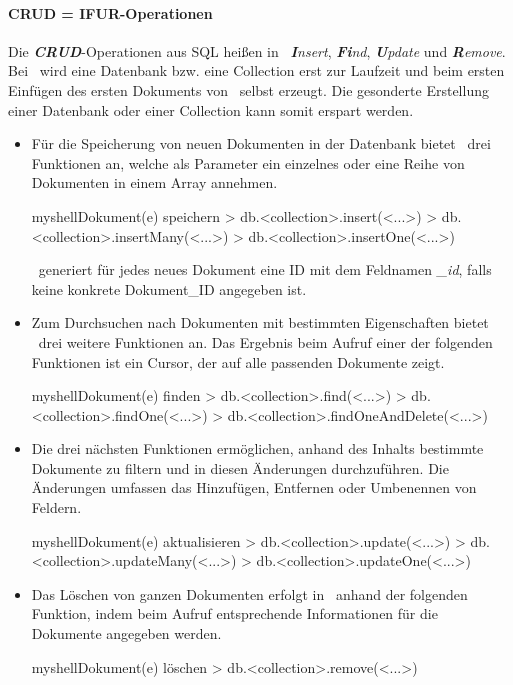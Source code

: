 \paragraph{CRUD = IFUR-Operationen}\label{ifur}
Die \textit{\textbf{CRUD}}-Operationen aus SQL heißen in \mongo\ \textit{\textbf{I}nsert}, \textit{\textbf{Fi}nd}, \textit{\textbf{U}pdate} und \textit{\textbf{R}emove}. Bei \mongo\ wird eine Datenbank bzw. eine Collection erst zur Laufzeit und beim ersten Einfügen des ersten Dokuments von \mongo\ selbst erzeugt. Die gesonderte Erstellung einer Datenbank oder einer Collection kann somit erspart werden.
\begin{itemize}
\item Für die Speicherung von neuen Dokumenten in der Datenbank bietet \mongo\ drei Funktionen an, welche als Parameter ein einzelnes oder eine Reihe von Dokumenten in einem Array annehmen. %
\begin{listingsboxShell}[label={lst:insert}]{myshell}{Dokument(e) speichern}
> db.<collection>.insert(<...>)
> db.<collection>.insertMany(<...>)
> db.<collection>.insertOne(<...>)
\end{listingsboxShell}
\mongo\ generiert für jedes neues Dokument eine ID mit dem Feldnamen \textit{\_id}, falls keine konkrete Dokument\_ID angegeben ist.

\item Zum Durchsuchen nach Dokumenten mit bestimmten Eigenschaften bietet \mongo\ drei weitere Funktionen an. Das Ergebnis beim Aufruf einer der folgenden Funktionen ist ein Cursor, der auf alle passenden Dokumente zeigt.
\begin{listingsboxShell}[label={lst:find}]{myshell}{Dokument(e) finden}
> db.<collection>.find(<...>)
> db.<collection>.findOne(<...>)
> db.<collection>.findOneAndDelete(<...>)
\end{listingsboxShell}

\item Die drei nächsten Funktionen ermöglichen, anhand des Inhalts bestimmte Dokumente zu filtern und in diesen Änderungen durchzuführen. Die Änderungen umfassen das Hinzufügen, Entfernen oder Umbenennen von Feldern.
\begin{listingsboxShell}[label={lst:update}]{myshell}{Dokument(e) aktualisieren}
> db.<collection>.update(<...>)
> db.<collection>.updateMany(<...>)
> db.<collection>.updateOne(<...>)
\end{listingsboxShell}

\item Das Löschen von ganzen Dokumenten erfolgt in \mongo\ anhand der folgenden Funktion, indem beim Aufruf entsprechende Informationen für die Dokumente angegeben werden.
\begin{listingsboxShell}[label={lst:remove}]{myshell}{Dokument(e) löschen}
> db.<collection>.remove(<...>)
\end{listingsboxShell}
\end{itemize}


